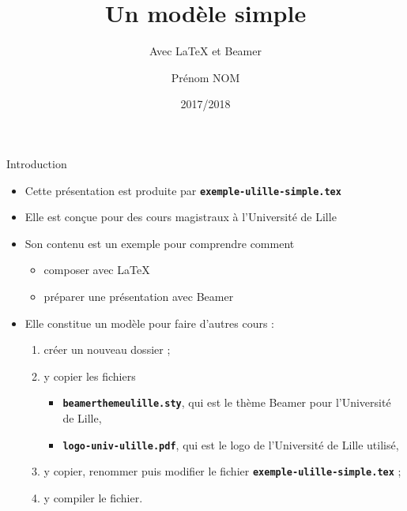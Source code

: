 \documentclass[10pt,t]{beamer}
\title{Un modèle simple}
\subtitle{Avec \LaTeX{} et Beamer}
\author{Prénom NOM}
\institute[]{Université de Lille}
\date{2017/2018}
\begin{document}
\maketitle


\begin{frame}{Introduction} 

  \begin{itemize}
  \item Cette présentation est produite par \texttt{\textbf{exemple-ulille-simple.tex}}
  \item Elle est conçue pour des cours magistraux à l'Université de Lille
  \item Son contenu est un exemple pour comprendre comment

    \begin{itemize}
    \item composer avec \LaTeX{}
    \item préparer une présentation avec Beamer
    \end{itemize}

  \end{itemize}

  \pause


  \begin{itemize}
  \item Elle constitue un modèle pour faire d'autres cours :
      
    \begin{enumerate}
    \item créer un nouveau dossier ;
    \item y copier les fichiers 
      
      \begin{itemize}
      \item \texttt{\textbf{beamerthemeulille.sty}}, qui est le thème Beamer pour l'Université de Lille,
      \item \texttt{\textbf{logo-univ-ulille.pdf}}, qui est le logo de l'Université de Lille utilisé,
      \end{itemize}
      
    \item y copier, renommer puis modifier le fichier \texttt{\textbf{exemple-ulille-simple.tex}} ;
    \item y compiler le fichier.
    \end{enumerate}
  \end{itemize}
\end{frame}
\end{document}
